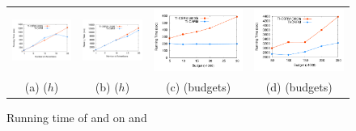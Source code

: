 \begin{figure}
\begin{tabular}{cccc}
    \includegraphics[width=.23\textwidth]{dblp_time_h}&
    \hspace{2mm}\includegraphics[width=.23\textwidth]{livej_time_h}&
    \hspace{2mm}\includegraphics[width=.23\textwidth]{dblp_time_B}&
        \hspace{2mm}\includegraphics[width=.23\textwidth]{livej_time_B}\\
	(a) \dblp ($h$) & (b) \livej ($h$)   & (c) \dblp (budgets)  & (d) \livej (budgets)  \\
\end{tabular}
\caption{Running time of \fastca and \fastcs on \dblp and \livej}
\label{fig:time}
\end{figure}
